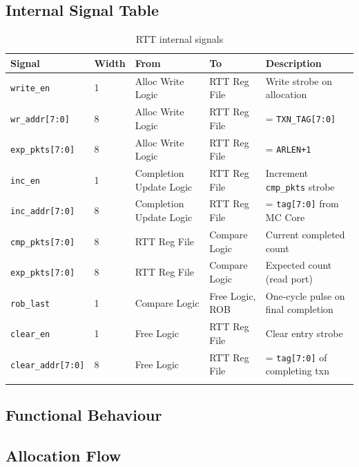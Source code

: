 \subsection{Internal Signal Table}

\begin{longtable}{p{2.8cm}p{1cm}p{2.5cm}p{2.5cm}p{5.5cm}}
\toprule
\textbf{Signal} & \textbf{Width} & \textbf{From} & \textbf{To} & \textbf{Description} \\
\midrule
\texttt{write\_en}        & 1   & Alloc Write Logic       & RTT Reg File         & Write strobe on allocation \\
\texttt{wr\_addr[7:0]}    & 8   & Alloc Write Logic       & RTT Reg File         & = \texttt{TXN\_TAG[7:0]} \\
\texttt{exp\_pkts[7:0]}   & 8   & Alloc Write Logic       & RTT Reg File         & = \texttt{ARLEN+1} \\
\texttt{inc\_en}          & 1   & Completion Update Logic & RTT Reg File         & Increment \texttt{cmp\_pkts} strobe \\
\texttt{inc\_addr[7:0]}   & 8   & Completion Update Logic & RTT Reg File         & = \texttt{tag[7:0]} from MC Core \\
\texttt{cmp\_pkts[7:0]}   & 8   & RTT Reg File            & Compare Logic        & Current completed count \\
\texttt{exp\_pkts[7:0]}   & 8   & RTT Reg File            & Compare Logic        & Expected count (read port) \\
\texttt{rob\_last}        & 1   & Compare Logic           & Free Logic, ROB      & One-cycle pulse on final completion \\
\texttt{clear\_en}        & 1   & Free Logic              & RTT Reg File         & Clear entry strobe \\
\texttt{clear\_addr[7:0]} & 8   & Free Logic              & RTT Reg File         & = \texttt{tag[7:0]} of completing txn \\
\bottomrule
\caption{RTT internal signals}
\end{longtable}

\subsection{Functional Behaviour}

\subsection{Allocation Flow}

